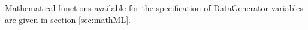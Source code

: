 Mathematical functions available for the specification of \hyperref[class:dataGenerator]{DataGenerator} variables are given in section \ref{sec:mathML}.







